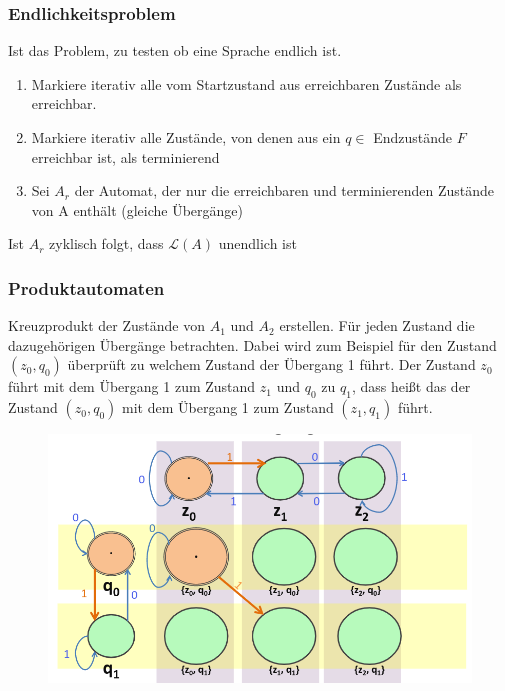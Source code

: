 \documentclass[12pt,a4paper]{article}
\begin{document}
	\subsubsection{Endlichkeitsproblem}
	Ist das Problem, zu testen ob eine Sprache endlich ist.
	\begin{enumerate}
		\item Markiere iterativ alle vom Startzustand aus erreichbaren Zustände als erreichbar.
		\item Markiere iterativ alle Zustände, von denen aus ein $q \in $ Endzustände $F$ erreichbar ist, als terminierend
		\item Sei $A_r$ der Automat, der nur die erreichbaren und terminierenden Zustände von A enthält (gleiche Übergänge)
	\end{enumerate}
	\vspace{.5cm}
	Ist $A_r$ zyklisch folgt, dass $\mathcal{L}(A)$ unendlich ist 

	\subsubsection{Produktautomaten}
	Kreuzprodukt der Zustände von $A_1$ und $A_2$ erstellen. \newline
	Für jeden Zustand die dazugehörigen Übergänge betrachten.\newline
	Dabei wird zum Beispiel für den Zustand $(z_0, q_0)$ überprüft zu welchem Zustand der Übergang 1 führt. Der Zustand $z_0$ führt mit dem Übergang 1 zum Zustand $z_1$ und $q_0$ zu $q_1$, dass heißt das der Zustand $(z_0, q_0)$ mit dem Übergang 1 zum Zustand $(z_1, q_1)$ führt.\newline
	\begin{center}
		\begin{figure}[!h]
			\includegraphics[width=\textwidth]{Bilder/ProduktautomatUbergang.png}
		\end{figure}
	\end{center}
\end{document}
